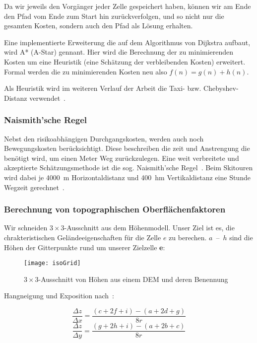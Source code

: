 Da wir jeweils den Vorgänger jeder Zelle gespeichert haben, können wir am Ende den Pfad vom Ende zum Start hin zurückverfolgen, und so nicht nur die gesamten Kosten, sondern auch den Pfad als Lösung erhalten.

Eine implementierte Erweiterung die auf dem Algorithmus von Dijkstra aufbaut, wird A* (A-Star) gennant. Hier wird die Berechnung der zu minimierenden Kosten um eine Heuristik (eine Schätzung der verbleibenden Kosten) erweitert. Formal werden die zu minimierenden Kosten neu also $f(n)=g(n)+h(n)$.~\cite{Hart1968}

Als Heuristik wird im weiteren Verlauf der Arbeit die Taxi- bzw. Chebyshev-Distanz verwendet~\cite{cantrell2000modern}.

\subsubsection{Naismith'sche Regel}

Nebst den risikoabhängigen Durchgangskosten, werden auch noch Bewegungskosten berücksichtigt. Diese beschreiben die zeit und Anstrengung die benötigt wird, um einen Meter Weg zurückzulegen. Eine weit verbreitete und akzeptierte Schätzungsmethode ist die sog. Naismith'sche Regel~\cite{naismithsrule}.
Beim Skitouren wird dabei je \qty{4000}{m} Horizontaldistanz und \qty{400}{hm} Vertikaldistanz eine Stunde Wegzeit gerechnet~\cite{sacbergspwinter}\cite{naismithsrule}.


\subsubsection{Berechnung von topographischen Oberflächenfaktoren}

Wir schneiden $3 \times 3$-Ausschnitt aus dem Höhenmodell. Unser Ziel ist es, die chrakteristischen Geländeeigenschaften für die Zelle $e$ zu berechen.
$a$~--~$h$ sind die Höhen der Gitterpunkte rund um unserer Zielzelle \textbf{e}:

\begin{figure}[H]
  \centering
  \texttt{[image: isoGrid]}
  \caption{$3 \times 3$-Ausschnitt von Höhen aus einem DEM und deren Benennung}
\end{figure}

Hangneigung und Exposition nach~\cite{gisslopeaspect}:

\begin{equation} \label{eq1}
  \frac{\Delta z}{\Delta x} = \frac{(c + 2f + i) - (a + 2d + g)}{8r}
\end{equation}
\begin{equation} \label{eq2}
  \frac{\Delta z}{\Delta y} = \frac{(g + 2h + i) - (a + 2b + c)}{8r}
\end{equation}

